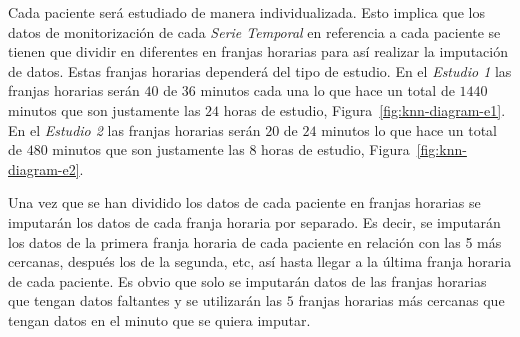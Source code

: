 Cada paciente será estudiado de manera individualizada. Esto implica que los datos de monitorización de cada \textit{Serie Temporal} en referencia a cada paciente se tienen que dividir en diferentes en franjas horarias para así realizar la imputación de datos. Estas franjas horarias dependerá del tipo de estudio. En el \textit{Estudio 1} las franjas horarias serán $40$ de $36$ minutos cada una lo que hace un total de $1440$ minutos que son justamente las $24$ horas de estudio, Figura~\ref{fig:knn-diagram-e1}. En el \textit{Estudio 2} las franjas horarias serán $20$ de $24$ minutos lo que hace un total de $480$ minutos que son justamente las $8$ horas de estudio, Figura~\ref{fig:knn-diagram-e2}.

Una vez que se han dividido los datos de cada paciente en franjas horarias se imputarán los datos de cada franja horaria por separado. Es decir, se imputarán los datos de la primera franja horaria de cada paciente en relación con las 5 más cercanas, después los de la segunda, etc, así hasta llegar a la última franja horaria de cada paciente. Es obvio que solo se imputarán datos de las franjas horarias que tengan datos faltantes y se utilizarán las $5$ franjas horarias más cercanas que tengan datos en el minuto que se quiera imputar.

